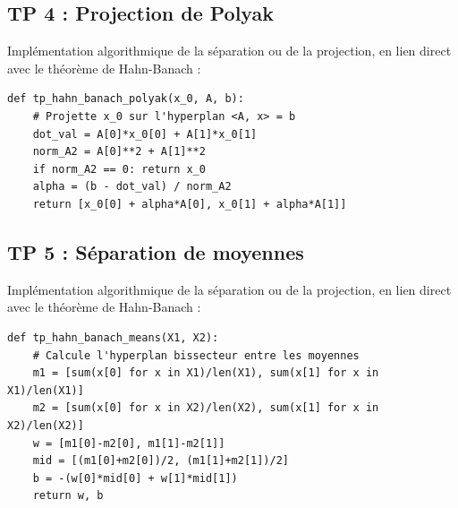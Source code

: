 \documentclass[11pt,a4paper]{article}
\begin{document}
\subsection*{TP 4 : Projection de Polyak}

Implémentation algorithmique de la séparation ou de la projection, en lien direct avec le théorème de Hahn-Banach :

\begin{lstlisting}
def tp_hahn_banach_polyak(x_0, A, b):
    # Projette x_0 sur l'hyperplan <A, x> = b
    dot_val = A[0]*x_0[0] + A[1]*x_0[1]
    norm_A2 = A[0]**2 + A[1]**2
    if norm_A2 == 0: return x_0
    alpha = (b - dot_val) / norm_A2
    return [x_0[0] + alpha*A[0], x_0[1] + alpha*A[1]]
\end{lstlisting}


\subsection*{TP 5 : Séparation de moyennes}

Implémentation algorithmique de la séparation ou de la projection, en lien direct avec le théorème de Hahn-Banach :

\begin{lstlisting}
def tp_hahn_banach_means(X1, X2):
    # Calcule l'hyperplan bissecteur entre les moyennes
    m1 = [sum(x[0] for x in X1)/len(X1), sum(x[1] for x in X1)/len(X1)]
    m2 = [sum(x[0] for x in X2)/len(X2), sum(x[1] for x in X2)/len(X2)]
    w = [m1[0]-m2[0], m1[1]-m2[1]]
    mid = [(m1[0]+m2[0])/2, (m1[1]+m2[1])/2]
    b = -(w[0]*mid[0] + w[1]*mid[1])
    return w, b
\end{lstlisting}
\end{document}
